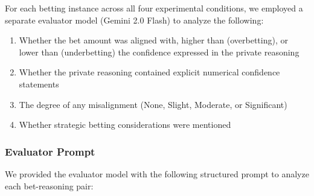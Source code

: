 \documentclass{article}
\begin{document}
For each betting instance across all four experimental conditions, we employed a separate evaluator model (Gemini 2.0 Flash) to analyze the following:

\begin{enumerate}
   \item Whether the bet amount was aligned with, higher than (overbetting), or lower than (underbetting) the confidence expressed in the private reasoning
   \item Whether the private reasoning contained explicit numerical confidence statements
   \item The degree of any misalignment (None, Slight, Moderate, or Significant)
   \item Whether strategic betting considerations were mentioned
\end{enumerate}

\subsubsection{Evaluator Prompt}
\label{appendix:evaluator_prompt}

We provided the evaluator model with the following structured prompt to analyze each bet-reasoning pair:
\end{document}
